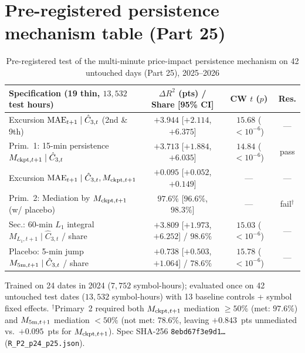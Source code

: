 \documentclass[12pt]{article}
\theoremstyle{definition}
\theoremstyle{remark}
\begin{document}
\section{Pre-registered persistence mechanism table (Part 25)}
\FloatBarrier
\begin{table}[!htbp]\centering\footnotesize
\begin{threeparttable}
\caption{Pre-registered test of the multi-minute price-impact persistence mechanism on 42 untouched days (Part 25), 2025--2026}\label{tab:p25}
\setlength{\tabcolsep}{1.8pt}
\begin{tabular}{lccc}
\toprule
Specification (19 thin, $13{,}532$ test hours) & $\Delta R^2$ (pts) / Share [95\% CI] & CW $t$ ($p$) & Res.\\
\midrule
Excursion ${\rm MAE}_{t+1}\mid\hat C_{3,t}$ (2nd \& 9th) & $+3.944$ [$+2.114$, $+6.375$] & $15.68$ ($<10^{-6}$) & ---\\
Prim.\ 1: 15-min persistence $M_{{\rm ckpt},t+1}\mid\hat C_{3,t}$ & $+3.713$ [$+1.884$, $+6.035$] & $14.84$ ($<10^{-6}$) & pass\\
Excursion ${\rm MAE}_{t+1}\mid\hat C_{3,t},M_{{\rm ckpt},t+1}$ & $+0.095$ [$+0.052$, $+0.149$] & --- & ---\\
Prim.\ 2: Mediation by $M_{{\rm ckpt},t+1}$ (w/ placebo) & $97.6\%$ [$96.6\%$, $98.3\%$] & --- & fail$^\dagger$\\
Sec.: 60-min $L_1$ integral $M_{L_1,t+1}\mid\hat C_{3,t}$ / share & $+3.809$ [$+1.973$, $+6.252$] / $98.6\%$ & $15.03$ ($<10^{-6}$) & ---\\
Placebo: 5-min jump $M_{5{\rm m},t+1}\mid\hat C_{3,t}$ / share & $+0.738$ [$+0.503$, $+1.064$] / $78.6\%$ & $15.78$ ($<10^{-6}$) & ---\\
\bottomrule
\end{tabular}
\begin{tablenotes}\footnotesize\item Trained on 24 dates in 2024 ($7{,}752$ symbol-hours); evaluated once on 42 untouched test dates ($13{,}532$ symbol-hours) with 13 baseline controls + symbol fixed effects. $^\dagger$Primary~2 required both $M_{{\rm ckpt},t+1}$ mediation $\ge50\%$ (met: $97.6\%$) and $M_{5{\rm m},t+1}$ mediation $<50\%$ (not met: $78.6\%$, leaving $+0.843$~pts unmediated vs.\ $+0.095$~pts for $M_{{\rm ckpt},t+1}$). Spec SHA-256 \texttt{8ebd67f3e9d1\ldots} (\texttt{R\_P2\_p24\_p25.json}).\end{tablenotes}
\end{threeparttable}
\end{table}
\FloatBarrier
\end{document}
